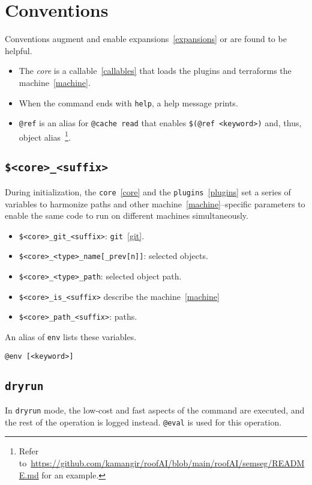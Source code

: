 \section{Conventions}
\label{conventions}

Conventions augment and enable expansions~\ref{expansions} or are found to be helpful.
%
\begin{itemize}
    \item The \emph{core} is a callable~\ref{callables} that loads the plugins and terraforms the machine~\ref{machine}.
    \item When the command ends with \texttt{help}, a help message prints.
    \item \texttt{@ref} is an alias for \texttt{@cache read} that enables \texttt{\$(@ref <keyword>)} and, thus, object alias~\footnote{Refer to~\url{https://github.com/kamangir/roofAI/blob/main/roofAI/semseg/README.md} for an example.}.
\end{itemize}  

\subsection{\texttt{\$<core>\_<suffix>}}
\label{awareness}

During initialization, the \texttt{core}~\ref{core} and the \texttt{plugins}~\ref{plugins} set a series of variables to harmonize paths and other machine~\ref{machine}--specific parameters to enable the same code to run on different machines simultaneously. 
%
\begin{itemize}
    \item{\texttt{\$<core>\_git\_<suffix>}: \texttt{git}~\ref{git}.}
    \item{\texttt{\$<core>\_<type>\_name[\_prev[n]]}: selected objects.}
    \item{\texttt{\$<core>\_<type>\_path}: selected object path.}
    \item{\texttt{\$<core>\_is\_<suffix>} describe the machine~\ref{machine}}
    \item{\texttt{\$<core>\_path\_<suffix>}: paths.}
\end{itemize}
%
An alias of \texttt{env} lists these variables.
%
\begin{verbatim}
@env [<keyword>]
\end{verbatim}

\subsection{\texttt{dryrun}}
\label{dryrun}

In \texttt{dryrun} mode, the low-cost and fast aspects of the command are executed, and the rest of the operation is logged instead. \texttt{@eval} is used for this operation. 








